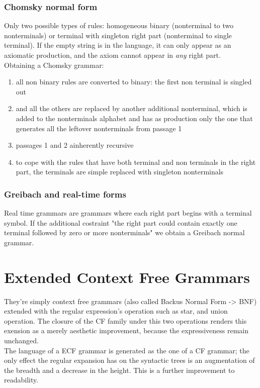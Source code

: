 \documentclass[10pt,a4paper]{article}
\begin{document}
			\subsubsection{Chomsky normal form}
				Only two possible types of rules: homogeneous binary (nonterminal to two nonterminals) or terminal with singleton right part (nonterminal to single terminal). If the empty string is in the language, it can only appear as an axiomatic production, and the axiom cannot appear in \emph{any} right part.\\
				Obtaining a Chomsky grammar:
				\begin{enumerate}
					\item all non binary rules are converted to binary: the first non terminal is singled out 
					\item and all the others are replaced by another additional nonterminal, which is added to the nonterminals alphabet and has as production only the one that generates all the leftover nonterminals from passage 1
					\item passages 1 and 2 ainherently recursive
					\item to cope with the rules that have both terminal and non terminals in the right part, the terminals are simple replaced with singleton nonterminals
				\end{enumerate}
			\subsubsection{Greibach and real-time forms}
				Real time grammars are grammars where each right part begins with a terminal symbol. If the additional costraint "the right part could contain exactly one terminal followed by zero or more nonterminals" we obtain a Greibach normal grammar.
				 
		\section{Extended Context Free Grammars}
			They're simply context free grammars (also called Backus Normal Form -> BNF) extended with the regular expression's operation such as star, and union operation. The closure of the CF family under this two operations renders this exension as a merely aesthetic improvement, because the expressiveness remain unchanged.\\
			The language of a ECF grammar is generated as the one of a CF grammar; the only effect the regular expansion has on the syntactic trees is an augmentation of the breadth and a decrease in the height. This is a further improvement to readability.
		
\end{document}
